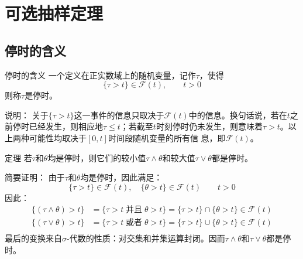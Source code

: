 \documentclass[t]{beamer}
\begin{document}
      \section{可选抽样定理}
      \subsection{停时的含义}
      \begin{frame}{停时的含义}
        一个定义在正实数域上的随机变量，记作$\tau$，使得
\begin{equation*}
\{\tau>t\}\in \mathcal{F}(t), \qquad t>0
\end{equation*}
则称$\tau$是停时。

\begin{block}{说明：}
关于$\{\tau>t\}$这一事件的信息只取决于$\mathcal{F}(t)$中的信息。换句话说，若在$t$之前停时已经发生，则相应地$\tau\le t$；若截至$t$时刻停时仍未发生，则意味着$\tau>t$。以上两种可能性均取决于$[0,t]$时间段随机变量的所有信
息，即$\mathcal{F}(t)$。
\end{block}
      \end{frame}


      \begin{frame}{定理}
        若$\tau$和$\theta$均是停时，则它们的较小值$\tau\wedge \theta$和较大值$\tau\vee \theta$都是停时。

        \begin{block}{简要证明：}
          由于$\tau$和$\theta$均是停时，因此满足：
\[\{\tau>t\}\in \mathcal{F}(t),\quad  \{\theta>t\}\in \mathcal{F}(t) \qquad t>0 \]
因此：
\[\begin{split}
\{(\tau\wedge \theta)>t\}&=\{\tau>t\; \text{并且}\; \theta>t \}=\{\tau>t\}\cap \{\theta>t\}\in \mathcal{F}(t)\\
\{(\tau\vee \theta)>t\}&=\{\tau>t\; \text{或者}\; \theta>t \}=\{\tau>t\}\cup \{\theta>t\}\in \mathcal{F}(t)\\
\end{split} \]
最后的变换来自$\sigma$-代数的性质：对交集和并集运算封闭。因而$\tau\wedge \theta$和$\tau\vee \theta$都是停时。
        \end{block}
      \end{frame}
\end{document}
